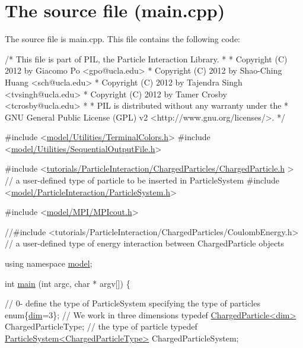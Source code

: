 \hypertarget{_p_i_chargedparticles_PI_chargedparticles_main}{}\section{The source file (main.\+cpp)}\label{_p_i_chargedparticles_PI_chargedparticles_main}
The source file is main.\+cpp. This file contains the following code\+: 
\begin{DoxyCodeInclude}
\textcolor{comment}{/* This file is part of PIL, the Particle Interaction Library.}
\textcolor{comment}{ *}
\textcolor{comment}{ * Copyright (C) 2012 by Giacomo Po <gpo@ucla.edu>}
\textcolor{comment}{ * Copyright (C) 2012 by Shao-Ching Huang <sch@ucla.edu>}
\textcolor{comment}{ * Copyright (C) 2012 by Tajendra Singh <tvsingh@ucla.edu>}
\textcolor{comment}{ * Copyright (C) 2012 by Tamer Crosby <tcrosby@ucla.edu>}
\textcolor{comment}{ *}
\textcolor{comment}{ * PIL is distributed without any warranty under the}
\textcolor{comment}{ * GNU General Public License (GPL) v2 <http://www.gnu.org/licenses/>.}
\textcolor{comment}{ */}


\textcolor{preprocessor}{#include <\hyperlink{_terminal_colors_8h}{model/Utilities/TerminalColors.h}>}
\textcolor{preprocessor}{#include <\hyperlink{_sequential_output_file_8h}{model/Utilities/SequentialOutputFile.h}>}

\textcolor{preprocessor}{#include <\hyperlink{_charged_particle_8h}{tutorials/ParticleInteraction/ChargedParticles/ChargedParticle.h}
      >} \textcolor{comment}{// a user-defined type of particle to be inserted in ParticleSystem}
\textcolor{preprocessor}{#include <\hyperlink{_particle_system_8h}{model/ParticleInteraction/ParticleSystem.h}>}

\textcolor{preprocessor}{#include <\hyperlink{_m_p_icout_8h}{model/MPI/MPIcout.h}>}

\textcolor{comment}{//#include <tutorials/ParticleInteraction/ChargedParticles/CoulombEnergy.h> // a user-defined type of
       energy interaction between ChargedParticle objects}



\textcolor{keyword}{using namespace }\hyperlink{namespacemodel}{model};

\textcolor{keywordtype}{int} \hyperlink{bench_2bary_search_2main_8cpp_a0ddf1224851353fc92bfbff6f499fa97}{main} (\textcolor{keywordtype}{int} argc, \textcolor{keywordtype}{char} * argv[]) \{

    \textcolor{comment}{// 0- define the type of ParticleSystem specifying the type of particles}
    \textcolor{keyword}{enum}\{\hyperlink{plot_search_8m_a382f3ca768b275b8d563604f7fc7df73}{dim}=3\}; \textcolor{comment}{// We work in three dimensions}
    \textcolor{keyword}{typedef} \hyperlink{classmodel_1_1_charged_particle}{ChargedParticle<dim>} ChargedParticleType; \textcolor{comment}{// the type of particle}
    \textcolor{keyword}{typedef} \hyperlink{structmodel_1_1_particle_system}{ParticleSystem<ChargedParticleType>} ChargedParticleSystem;
    

\end{DoxyCodeInclude}
